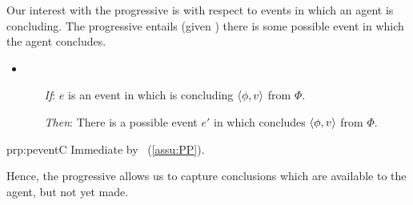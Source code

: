 \begin{note}
  Our interest with the progressive is with respect to events in which an agent is concluding.
  The progressive entails (given \assuPP{}) there is some possible event in which the agent concludes.

  \begin{proposition}
    \label{prp:peventC}

    \begin{itemize}
    \item
      \begin{itemize}
      \item[\emph{If}:]
        \(e\) is an event in which \vAgent{} is concluding \(\langle \phi, v \rangle\) from \(\Phi\).
      \item[\emph{Then}:]
        There is a possible event \(e'\) in which \vAgent{} concludes \(\langle \phi, v \rangle\) from \(\Phi\).
      \end{itemize}
    \end{itemize}
    \vspace{-\baselineskip}
  \end{proposition}

  \begin{argument}{prp:peventC}
    Immediate by \assuPP{}~(\autoref{assu:PP}).
  \end{argument}

  Hence, the progressive allows us to capture conclusions which are available to the agent, but not yet made.
\end{note}

